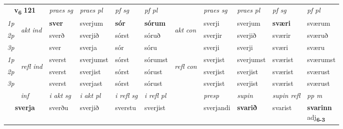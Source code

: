 \noindent
\begin{tabular}{lllllllllll} \toprule
\multicolumn{2}{c}{\textbf{v{\textsubscript{6}}} \Large{\textbf{121}}}  &  \textit{praes sg}  & \textit{praes pl}  &\textit{ pf sg} & \textit{pf pl} &  &  \textit{praes sg}  & \textit{praes pl}  & \textit{pf sg} & \textit{pf pl } \\*
	\cmidrule{3-6} \cmidrule{8-11}
 {\textit{1p}} & \multirow{3}{*}{\begin{turn}{90}\textit{akt ind}\end{turn}} & \textbf{sver} & sverjum & \textbf{sór} & \textbf{sórum} & \multirow{3}{*}{\begin{turn}{90}\textit{akt con}\end{turn}} &sverji & sverjum & \textbf{sværi} & sværum\\*
 {\textit{2p}} &  &  sverð  & sverjið & sórst & sóruð & & sverjir & sverjið & sværir & sværuð \\*
{\textit{3p}} &  & sver & sverja & sór & sóru & & sverji & sverji& sværi & sværu \\*
\cmidrule{3-6} \cmidrule{8-11}
 {\textit{1p}} & \multirow{3}{*}{\begin{turn}{90}\textit{refl ind}\end{turn}}  & sverst & sverjumst & sórst & sórumst & \multirow{3}{*}{\begin{turn}{90}\textit{refl con}\end{turn}}  &sverjist & sverjumst & sværist & sværumst \\*
 {\textit{2p}} &  & sverst & sverjist & sórst & sórust & &sverjist & sverjist & sværist & sværust \\*
 {\textit{3p}}  & & sverst & sverjast & sórst & sórust & & sverjist & sverjist& sværist & sværust \\*
\cmidrule{3-6} \cmidrule{8-11}

   \multicolumn{2}{c}{\textit{inf}}  & \textit{i akt sg} & \textit{i akt pl} & \textit{i refl sg} & \textit{i refl pl} && \textit{presp} & \textit{supin} & \textit{supin refl} & \textit{pp m} \\*
  \multicolumn{2}{c}{\textbf{sverja}} & sverðu  & sverjið & sverstu & sverjist && sverjandi &  \textbf{svarið} & svarist & \specialcell{\textbf{svarinn} \\ adj\textbf{\textsubscript{6-3}}} \\*
\end{tabular}

